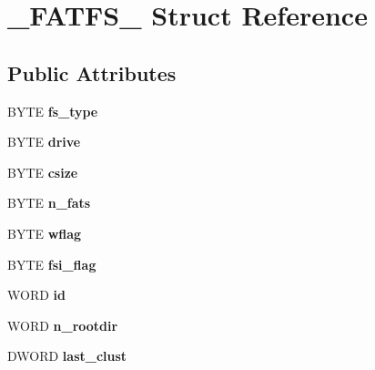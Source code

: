 \hypertarget{struct__FATFS__}{\section{\-\_\-\-F\-A\-T\-F\-S\-\_\- Struct Reference}
\label{struct__FATFS__}
}
\subsection*{Public Attributes}
\begin{DoxyCompactItemize}
\item 
\hypertarget{struct__FATFS___a5aee493c423bc27d35f0d0dd19f5ccfb}{B\-Y\-T\-E {\bfseries fs\-\_\-type}}\label{struct__FATFS___a5aee493c423bc27d35f0d0dd19f5ccfb}

\item 
\hypertarget{struct__FATFS___a65f72b39a544a2f99384e40e38b49b52}{B\-Y\-T\-E {\bfseries drive}}\label{struct__FATFS___a65f72b39a544a2f99384e40e38b49b52}

\item 
\hypertarget{struct__FATFS___ad2926da6ffa6058831225cc2b35feb08}{B\-Y\-T\-E {\bfseries csize}}\label{struct__FATFS___ad2926da6ffa6058831225cc2b35feb08}

\item 
\hypertarget{struct__FATFS___aa0e8bbe9171fb89f3bfb817d82762532}{B\-Y\-T\-E {\bfseries n\-\_\-fats}}\label{struct__FATFS___aa0e8bbe9171fb89f3bfb817d82762532}

\item 
\hypertarget{struct__FATFS___a9d678c984b988c1e7ab021d4971ce1d5}{B\-Y\-T\-E {\bfseries wflag}}\label{struct__FATFS___a9d678c984b988c1e7ab021d4971ce1d5}

\item 
\hypertarget{struct__FATFS___a284d62b85294ec13b1864eda5db40e4b}{B\-Y\-T\-E {\bfseries fsi\-\_\-flag}}\label{struct__FATFS___a284d62b85294ec13b1864eda5db40e4b}

\item 
\hypertarget{struct__FATFS___a28504d4f4828d7320b3742b6421f1216}{W\-O\-R\-D {\bfseries id}}\label{struct__FATFS___a28504d4f4828d7320b3742b6421f1216}

\item 
\hypertarget{struct__FATFS___a44539dbeede5ddd06890016059bc3be4}{W\-O\-R\-D {\bfseries n\-\_\-rootdir}}\label{struct__FATFS___a44539dbeede5ddd06890016059bc3be4}

\item 
\hypertarget{struct__FATFS___a19cef59c36e78983f438e05b29efc83b}{D\-W\-O\-R\-D {\bfseries last\-\_\-clust}}\label{struct__FATFS___a19cef59c36e78983f438e05b29efc83b}


\end{DoxyCompactItemize}
